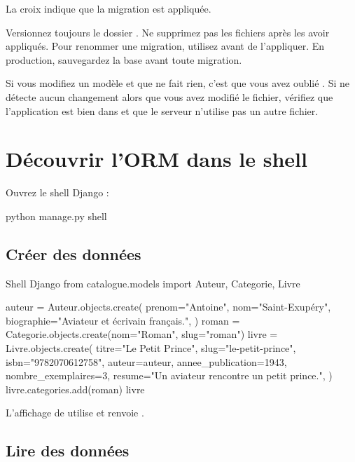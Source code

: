 La croix indique que la migration est appliquée.

\begin{bonne}
Versionnez toujours le dossier . Ne supprimez pas les fichiers
après les avoir appliqués. Pour renommer une migration, utilisez
 avant de l'appliquer. En production, sauvegardez la
base avant toute migration.
\end{bonne}

\begin{piege}
Si vous modifiez un modèle et que  ne fait rien, c'est que vous avez
oublié . Si  ne détecte aucun changement
alors que vous avez modifié le fichier, vérifiez que l'application est bien dans
 et que le serveur n'utilise pas un autre fichier.
\end{piege}

\section{Découvrir l'ORM dans le shell}

Ouvrez le shell Django :

\begin{terminal}
python manage.py shell
\end{terminal}

\subsection{Créer des données}

\begin{codebox}[python]{Shell Django}
from catalogue.models import Auteur, Categorie, Livre

auteur = Auteur.objects.create(
    prenom="Antoine",
    nom="Saint-Exupéry",
    biographie="Aviateur et écrivain français.",
)
roman = Categorie.objects.create(nom="Roman", slug="roman")
livre = Livre.objects.create(
    titre="Le Petit Prince",
    slug="le-petit-prince",
    isbn="9782070612758",
    auteur=auteur,
    annee_publication=1943,
    nombre_exemplaires=3,
    resume="Un aviateur rencontre un petit prince.",
)
livre.categories.add(roman)
livre
\end{codebox}

L'affichage de  utilise  et renvoie
.

\subsection{Lire des données}

